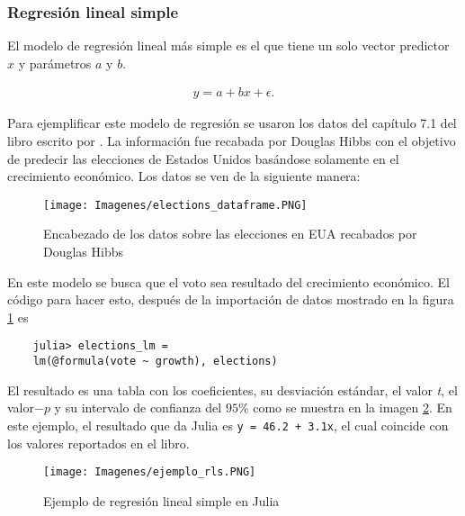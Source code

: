 \subsubsection{Regresión lineal simple}
El modelo de regresión lineal más simple es el que tiene un solo vector predictor $x$ y parámetros $a$ y $b$. 

\begin{equation*}
    \begin{aligned}
    y = a + bx + \epsilon.
    \end{aligned}
\end{equation*}

Para ejemplificar este modelo de regresión se usaron los datos del capítulo 7.1 del libro escrito por \cite{regression_other_stories}. La información fue recabada por Douglas Hibbs con el objetivo de predecir las elecciones de Estados Unidos basándose solamente en el crecimiento económico. Los datos se ven de la siguiente manera: 

\begin{figure}[H]
\begin{center}
\texttt{[image: Imagenes/elections\_dataframe.PNG]}
\caption{Encabezado de los datos sobre las elecciones en EUA recabados por Douglas Hibbs}
  \label{elections_dataframe}
\end{center}
\end{figure}

En este modelo se busca que el voto sea resultado del crecimiento económico. El código para hacer esto, después de la importación de datos mostrado en la figura \ref{elections_dataframe} es

\begin{verbatim}
	julia> elections_lm = 
	lm(@formula(vote ~ growth), elections)
\end{verbatim}

El resultado es una tabla con los coeficientes, su desviación estándar, el valor \textit{t}, el valor$-p$ y su intervalo de confianza del $95 \% $ como se muestra en la imagen \ref{ejemplo_rls}. En este ejemplo, el resultado que da \textsf{Julia} es \texttt{y = 46.2 + 3.1x}, el cual coincide con los valores reportados en el libro.

\begin{figure}[h]
	\begin{center}
		\texttt{[image: Imagenes/ejemplo\_rls.PNG]}
		\caption{Ejemplo de regresión lineal simple en \textsf{Julia}}
		\label{ejemplo_rls}
	\end{center}
\end{figure}

